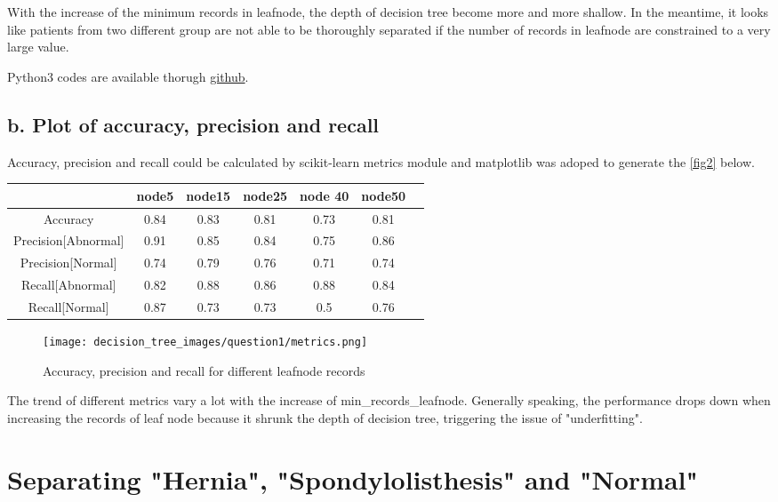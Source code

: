 \documentclass{article}
\begin{document}
With the increase of the minimum records in leafnode, the depth of decision tree become more and more shallow. In the meantime, it looks like patients from two different group are not able to be thoroughly separated if the number of records in leafnode are constrained to a very large value.

Python3 codes are available thorugh \href{https://github.com/frankligy/exercise_codes/blob/master/hw1_desicion_tree.py}{github}.

\subsection*{b. Plot of accuracy, precision and recall}
Accuracy, precision and recall could be calculated by scikit-learn metrics module and matplotlib was adoped to generate the \autoref{fig2} below.
\begin{center}
    \begin{tabular}{|c|c|c|c|c|c|c|}
    \hline
     & node5 & node15 & node25 &node 40 & node50 \\
    \hline
    Accuracy & 0.84 & 0.83 & 0.81 & 0.73 & 0.81\\
    \hline
    Precision[Abnormal] & 0.91 & 0.85 & 0.84 & 0.75 & 0.86\\
    \hline
    Precision[Normal] & 0.74 & 0.79 & 0.76 & 0.71 & 0.74\\
    \hline
    Recall[Abnormal] & 0.82 & 0.88 & 0.86 & 0.88 & 0.84\\
    \hline
    Recall[Normal]& 0.87 & 0.73& 0.73 & 0.5& 0.76\\
    \hline
    \end{tabular}
\end{center}
\begin{figure}[H]
    \centering
    \texttt{[image: decision\_tree\_images/question1/metrics.png]}
    \caption{Accuracy, precision and recall for different leafnode records}
    \label{fig2}
\end{figure}

The trend of different metrics vary a lot with the increase of min\_records\_leafnode. Generally speaking, the performance drops down when increasing the records of leaf node because it shrunk the depth of decision tree, triggering the issue of "underfitting".

\section{Separating "Hernia", "Spondylolisthesis" and "Normal"}
\end{document}

